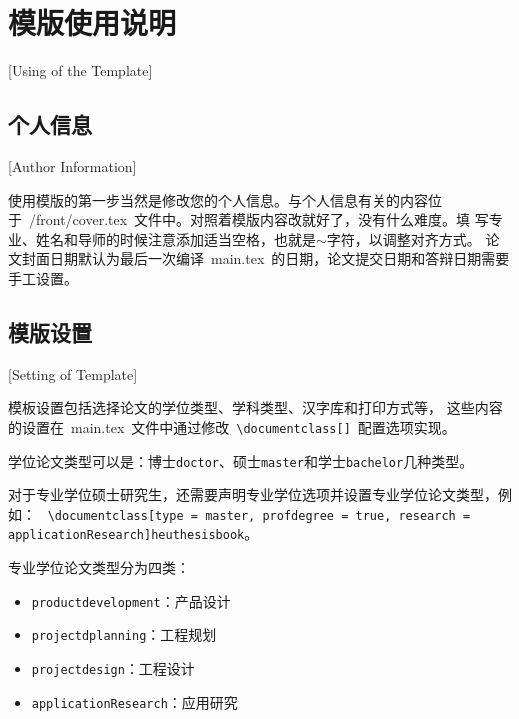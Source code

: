
%
%
%

\chapter{模版使用说明}[Using of the Template]
\label{chap03}

\section{个人信息}[Author Information]

使用模版的第一步当然是修改您的个人信息。与个人信息有关的内容位
于~{/front/cover.tex}~文件中。对照着模版内容改就好了，没有什么难度。填
写专业、姓名和导师的时候注意添加适当空格，也就是$\sim$字符，以调整对齐方式。
论文封面日期默认为最后一次编译~main.tex~的日期，论文提交日期和答辩日期需要手工设置。

\section{模版设置}[Setting of Template]

模板设置包括选择论文的学位类型、学科类型、汉字库和打印方式等，
这些内容的设置在~main.tex~文件中通过修改~\texttt{\textbackslash documentclass[]}~配置选项实现。

学位论文类型可以是：博士\texttt{doctor}、硕士\texttt{master}和学士\texttt{bachelor}几种类型。

对于专业学位硕士研究生，还需要声明专业学位选项并设置专业学位论文类型，例如：
~\texttt{\textbackslash documentclass[type = master, profdegree = true, research = applicationResearch]{heuthesisbook}}。

专业学位论文类型分为四类：
\begin{itemize}
  \item \texttt{productdevelopment}：产品设计
  \item \texttt{projectdplanning}：工程规划
  \item \texttt{projectdesign}：工程设计
  \item \texttt{applicationResearch}：应用研究
\end{itemize}

